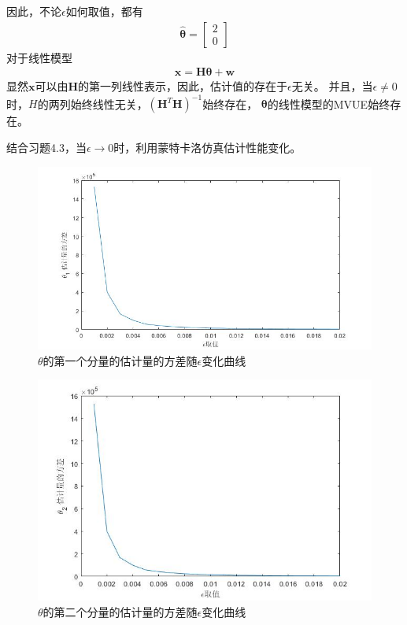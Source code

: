 \documentclass[fontset=windows]{article}
\numberwithin{figure}{section}
\begin{document}
因此，不论\(\epsilon\)如何取值，都有
\begin{align*}
	\hat{\boldsymbol{\theta}}=
	\begin{bmatrix}
		2 \\0
	\end{bmatrix}
\end{align*}
对于线性模型
\begin{align*}
	\mathbf{x}=\mathbf{H}\boldsymbol{\theta}+\mathbf{w}
\end{align*}
显然\(\mathbf{x}\)可以由\(\mathbf{H}\)的第一列线性表示，因此，估计值的存在于\(\epsilon\)无关。
并且，当\(\epsilon \neq 0\)时，\(H\)的两列始终线性无关，\((\mathbf{H}^T\mathbf{H})^{-1}\)始终存在，
\(\boldsymbol{\theta}\)的线性模型的MVUE始终存在。

结合习题4.3，当\(\epsilon\to 0\)时，利用蒙特卡洛仿真估计性能变化。

\begin{figure}[H]
	\centering
	\includegraphics[scale=0.5]{fig3.1.jpg}
	\caption{\(\theta\)的第一个分量的估计量的方差随\(\epsilon\)变化曲线}
	\label{3.1}
\end{figure}

\begin{figure}[H]
	\centering
	\includegraphics[scale=0.5]{fig3.2.jpg}
	\caption{\(\theta\)的第二个分量的估计量的方差随\(\epsilon\)变化曲线}
	\label{3.2}
\end{figure}
\end{document}
